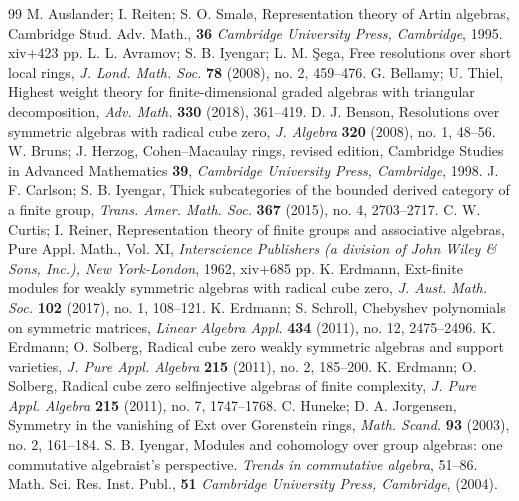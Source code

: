 \documentclass{amsart}
\theoremstyle{definition}
\theoremstyle{remark}
\numberwithin{equation}{thm}
\begin{document}
\begin{thebibliography}{99}
{\sc M. Auslander; I. Reiten; S. O. Smal{\o}}, Representation theory of Artin algebras,  Cambridge Stud. Adv. Math., {\bf 36} {\it Cambridge University Press, Cambridge}, 1995. xiv+423 pp.
{\sc L. L. Avramov; S. B. Iyengar; L. M. \c{S}ega}, Free resolutions over short local rings, {\it J. Lond. Math. Soc.} {\bf 78} (2008), no. 2, 459--476.
{\sc G. Bellamy; U. Thiel}, Highest weight theory for finite-dimensional graded algebras with triangular decomposition, {\it Adv. Math.} {\bf 330} (2018), 361--419.
{\sc D. J. Benson}, Resolutions over symmetric algebras with radical cube zero, {\it J. Algebra} {\bf 320} (2008), no. 1, 48--56.
{\sc W. Bruns; J. Herzog}, Cohen--Macaulay rings, revised edition, Cambridge Studies in Advanced Mathematics {\bf 39}, {\it Cambridge University Press, Cambridge}, 1998.
{\sc J. F. Carlson; S. B. Iyengar}, Thick subcategories of the bounded derived category of a finite group, {\it Trans. Amer. Math. Soc.} {\bf 367} (2015), no. 4, 2703--2717.
{\sc C. W. Curtis; I. Reiner}, Representation theory of finite groups and associative algebras, Pure Appl. Math., Vol. XI, {\it Interscience Publishers (a division of John Wiley {\rm \&} Sons, Inc.), New York-London}, 1962, xiv+685 pp.
{\sc K. Erdmann}, Ext-finite modules for weakly symmetric algebras with radical cube zero, {\it J. Aust. Math. Soc.} {\bf 102} (2017), no. 1, 108--121.
{\sc K. Erdmann; S. Schroll}, Chebyshev polynomials on symmetric matrices, {\it Linear Algebra Appl.} {\bf 434} (2011), no. 12, 2475--2496.
{\sc K. Erdmann; O. Solberg}, Radical cube zero weakly symmetric algebras and support varieties, {\it J. Pure Appl. Algebra} {\bf 215} (2011), no. 2, 185--200.
{\sc K. Erdmann; O. Solberg}, Radical cube zero selfinjective algebras of finite complexity, {\it J. Pure Appl. Algebra} {\bf 215} (2011), no. 7, 1747--1768.
{\sc C. Huneke; D. A. Jorgensen}, Symmetry in the vanishing of Ext over Gorenstein rings, {\it Math. Scand.} {\bf 93} (2003), no. 2, 161--184.
{\sc S. B. Iyengar}, Modules and cohomology over group algebras: one commutative algebraist's perspective. {\it Trends in commutative algebra}, 51--86. Math. Sci. Res. Inst. Publ., {\bf 51} {\it Cambridge University Press, Cambridge}, (2004).

\end{thebibliography}
\end{document}
